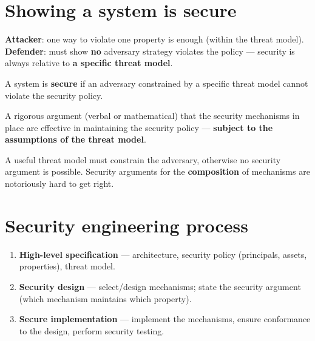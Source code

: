 \section{Showing a system is secure}

\begin{rembox}[title=Attacker vs.\ defender]
\textbf{Attacker}: one way to violate one property is enough (within the threat model). \\
\textbf{Defender}: must show \textbf{no} adversary strategy violates the policy —
security is always relative to \textbf{a specific threat model}.
\end{rembox}

\begin{defnbox}[title=Secure]
A system is \textbf{secure} if an adversary constrained by a specific threat model
cannot violate the security policy.
\end{defnbox}

\begin{defnbox}[title=Security argument]
A rigorous argument (verbal or mathematical) that the security mechanisms in place are
effective in maintaining the security policy — \textbf{subject to the assumptions of
the threat model}.
\end{defnbox}

\begin{warnbox}[title=Composition is hard]
A useful threat model must constrain the adversary, otherwise no security argument is
possible. Security arguments for the \textbf{composition} of mechanisms are notoriously
hard to get right.
\end{warnbox}

\section{Security engineering process}

\begin{algbox}[title=Three-stage process]
\begin{enumerate}
  \item \textbf{High-level specification} — architecture, security policy (principals, assets, properties), threat model.
  \item \textbf{Security design} — select/design mechanisms; state the security argument (which mechanism maintains which property).
  \item \textbf{Secure implementation} — implement the mechanisms, ensure conformance to the design, perform security testing.
\end{enumerate}
\end{algbox}

